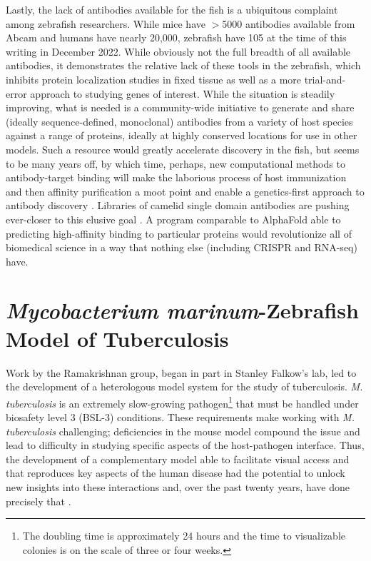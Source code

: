 Lastly, the lack of antibodies available for the fish is a ubiquitous complaint among zebrafish researchers. While mice have $>$5000 antibodies available from Abcam and humans have nearly 20,000, zebrafish have 105 at the time of this writing in December 2022. While obviously not the full breadth of all available antibodies, it demonstrates the relative lack of these tools in the zebrafish, which inhibits protein localization studies in fixed tissue as well as a more trial\hyp{}and\hyp{}error approach to studying genes of interest. While the situation is steadily improving, what is needed is a community\hyp{}wide initiative to generate and share (ideally sequence\hyp{}defined, monoclonal) antibodies from a variety of host species against a range of proteins, ideally at highly conserved locations for use in other models. Such a resource would greatly accelerate discovery in the fish, but seems to be many years off, by which time, perhaps, new computational methods to antibody\hyp{}target binding will make the laborious process of host immunization and then affinity purification a moot point and enable a genetics\hyp{}first approach to antibody discovery \citep{Wilman2022, Hummer2022, Akbar2022a, Akbar2022b, Shan2022}. Libraries of camelid single domain antibodies are pushing ever\hyp{}closer to this elusive goal \citep{Moutel2016, ValdesTresanco2022}. A program comparable to AlphaFold able to predicting high\hyp{}affinity binding to particular proteins would revolutionize all of biomedical science in a way that nothing else (including CRISPR and RNA\hyp{}seq) have.

\section{\textit{Mycobacterium marinum}\hyp{}Zebrafish Model of Tuberculosis}\label{zfmm}

Work by the Ramakrishnan group, began in part in Stanley Falkow's lab, led to the development of a heterologous model system for the study of tuberculosis. \textit{M. tuberculosis} is an extremely slow\hyp{}growing pathogen\footnote{The doubling time is approximately 24 hours and the time to visualizable colonies is on the scale of three or four weeks.} that must be handled under biosafety level 3 (BSL\hyp{}3) conditions. These requirements make working with \textit{M. tuberculosis} challenging; deficiencies in the mouse model compound the issue and lead to difficulty in studying specific aspects of the host\hyp{}pathogen interface. Thus, the development of a complementary model able to facilitate visual access and that reproduces key aspects of the human disease had the potential to unlock new insights into these interactions and, over the past twenty years, have done precisely that \citep{Myllymaki2016}.

